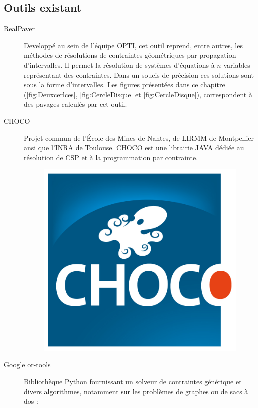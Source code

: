  \clearpage
 
 \subsection{Outils existant}
\begin{description}
 \item [RealPaver]\label{realp}
Developpé  au sein de l'équipe \textsc{OPTI}, cet outil reprend, entre autres, les méthodes de résolutions de contraintes géométriques par propagation d'intervalles. Il permet la résolution de systèmes d'équations à $n$ variables représentant des contraintes. Dans un soucis de précision ces solutions sont sous la forme d'intervalles. Les figures présentées dans ce chapitre (\ref{fig:Deuxcerlces}, \ref{fig:CercleDisque} et \ref{fig:CercleDisque}), correspondent à des pavages calculés par cet outil. \cite{realpaver}
\item [CHOCO]  Projet commun  de l'École des Mines de Nantes, de \textsc{LIRMM} de Montpellier ansi que l'INRA de Toulouse. \textsc{CHOCO} est une librairie  \textsc{JAVA}  dédiée au résolution de \textsc{CSP} et à la programmation par contrainte. \cite{choco}
 \begin{figure}[h] %
  \center
\includegraphics[scale=0.50]{img/choco}
\end{figure} %


\item [Google or-tools]
 Bibliothèque Python fournissant un solveur de contraintes générique et divers algorithmes, notamment sur les problèmes de graphes ou de sacs à dos : \cite{ortools}



\end{description}
